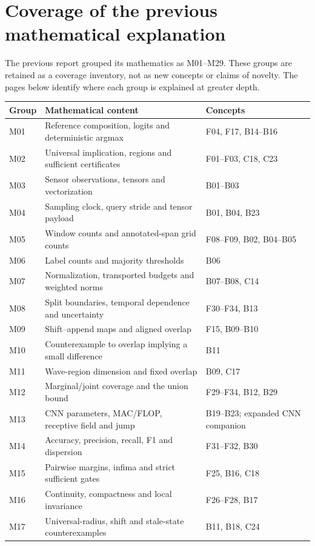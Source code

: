 \clearpage
\renewcommand{\conceptid}{Coverage crosswalks}
\appendix
\section{Coverage of the previous mathematical explanation}
The previous report grouped its mathematics as M01--M29. These groups are
retained as a coverage inventory, not as new concepts or claims of novelty.
The pages below identify where each group is explained at greater depth.
\small
\begin{longtable}{@{}P{1.2cm}P{7.3cm}P{6.7cm}@{}}\toprule
Group & Mathematical content & Concepts\\\midrule\endhead
M01 & Reference composition, logits and deterministic argmax & F04, F17, B14--B16\\
M02 & Universal implication, regions and sufficient certificates & F01--F03, C18, C23\\
M03 & Sensor observations, tensors and vectorization & B01--B03\\
M04 & Sampling clock, query stride and tensor payload & B01, B04, B23\\
M05 & Window counts and annotated-span grid counts & F08--F09, B02, B04--B05\\
M06 & Label counts and majority thresholds & B06\\
M07 & Normalization, transported budgets and weighted norms & B07--B08, C14\\
M08 & Split boundaries, temporal dependence and uncertainty & F30--F34, B13\\
M09 & Shift--append maps and aligned overlap & F15, B09--B10\\
M10 & Counterexample to overlap implying a small difference & B11\\
M11 & Wave-region dimension and fixed overlap & B09, C17\\
M12 & Marginal/joint coverage and the union bound & F29--F34, B12, B29\\
M13 & CNN parameters, MAC/FLOP, receptive field and jump & B19--B23; expanded CNN companion\\
M14 & Accuracy, precision, recall, F1 and dispersion & F31--F32, B30\\
M15 & Pairwise margins, infima and strict sufficient gates & F25, B16, C18\\
M16 & Continuity, compactness and local invariance & F26--F28, B17\\
M17 & Universal-radius, shift and stale-state counterexamples & B11, B18, C24\\

\end{longtable}
